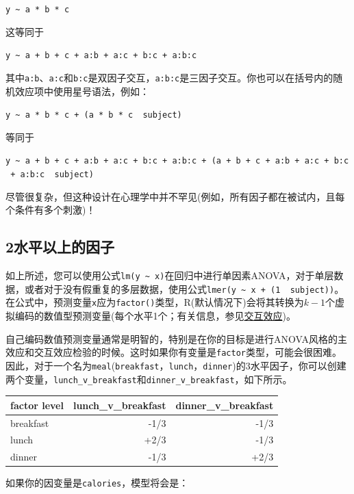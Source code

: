 \documentclass[
]{book}
\begin{document}
\texttt{y\ \textasciitilde{}\ a\ *\ b\ *\ c}

这等同于

\texttt{y\ \textasciitilde{}\ a\ +\ b\ +\ c\ +\ a:b\ +\ a:c\ +\ b:c\ +\ a:b:c}

其中\texttt{a:b}、\texttt{a:c}和\texttt{b:c}是双因子交互，\texttt{a:b:c}是三因子交互。你也可以在括号内的随机效应项中使用星号语法，例如：

\texttt{y\ \textasciitilde{}\ a\ *\ b\ *\ c\ +\ (a\ *\ b\ *\ c\ \textbar{}\ subject)}

等同于

\texttt{y\ \textasciitilde{}\ a\ +\ b\ +\ c\ +\ a:b\ +\ a:c\ +\ b:c\ +\ a:b:c\ +\ (a\ +\ b\ +\ c\ +\ a:b\ +\ a:c\ +\ b:c\ +\ a:b:c\ \textbar{}\ subject)}

尽管很复杂，但这种设计在心理学中并不罕见(例如，所有因子都在被试内，且每个条件有多个刺激)！

\hypertarget{ux6c34ux5e73ux4ee5ux4e0aux7684ux56e0ux5b50}{%
\subsection{2水平以上的因子}\label{ux6c34ux5e73ux4ee5ux4e0aux7684ux56e0ux5b50}}

如上所述，您可以使用公式\texttt{lm(y\ \textasciitilde{}\ x)}在回归中进行单因素ANOVA，对于单层数据，或者对于没有假重复的多层数据，使用公式\texttt{lmer(y\ \textasciitilde{}\ x\ +\ (1\ \textbar{}\ subject))}。在公式中，预测变量\texttt{x}应为\texttt{factor()}类型，R(默认情况下)会将其转换为\(k-1\)个虚拟编码的数值型预测变量(每个水平1个；有关信息，参见\protect\hyperlink{ux4ea4ux4e92ux6548ux5e94}{交互效应})。

自己编码数值预测变量通常是明智的，特别是在你的目标是进行ANOVA风格的主效应和交互效应检验的时候。这时如果你有变量是\texttt{factor}类型，可能会很困难。因此，对于一个名为\texttt{meal}(\texttt{breakfast}，\texttt{lunch}，\texttt{dinner})的3水平因子，你可以创建两个变量，\texttt{lunch\_v\_breakfast}和\texttt{dinner\_v\_breakfast}，如下所示。

\begin{tabular}{l|r|r}
\hline
factor level & lunch\_v\_breakfast & dinner\_v\_breakfast\\
\hline
breakfast & -1/3 & -1/3\\
\hline
lunch & +2/3 & -1/3\\
\hline
dinner & -1/3 & +2/3\\
\hline
\end{tabular}

如果你的因变量是\texttt{calories}，模型将会是：
\end{document}
